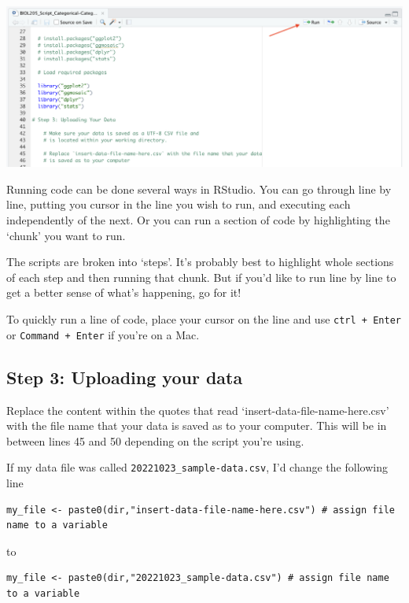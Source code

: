 \documentclass[
]{book}
\begin{document}
\includegraphics{images/run_button.png}

Running code can be done several ways in RStudio. You can go through line by line, putting you cursor in the line you wish to run, and executing each independently of the next. Or you can run a section of code by highlighting the `chunk' you want to run.

The scripts are broken into `steps'. It's probably best to highlight whole sections of each step and then running that chunk. But if you'd like to run line by line to get a better sense of what's happening, go for it!

To quickly run a line of code, place your cursor on the line and use \texttt{ctrl\ +\ Enter} or \texttt{Command\ +\ Enter} if you're on a Mac.

\hypertarget{step-3-uploading-your-data}{%
\subsection*{Step 3: Uploading your data}\label{step-3-uploading-your-data}}

Replace the content within the quotes that read `insert-data-file-name-here.csv' with the file name that your data is saved as to your computer. This will be in between lines 45 and 50 depending on the script you're using.

If my data file was called \texttt{20221023\_sample-data.csv}, I'd change the following line

\begin{verbatim}
my_file <- paste0(dir,"insert-data-file-name-here.csv") # assign file name to a variable
\end{verbatim}

to

\begin{verbatim}
my_file <- paste0(dir,"20221023_sample-data.csv") # assign file name to a variable
\end{verbatim}
\end{document}
